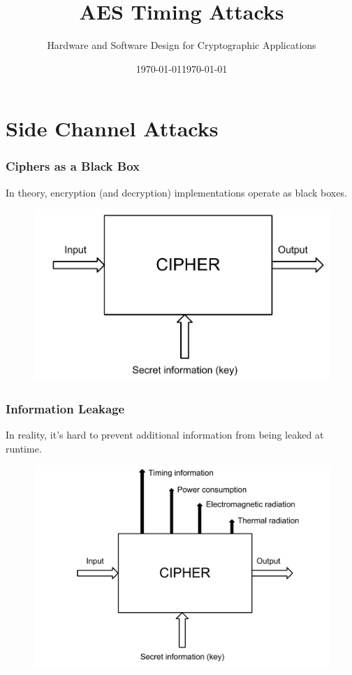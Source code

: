 \documentclass[9pt,handout]{beamer}
\title[AES Timing Attacks]{AES Timing Attacks}
\institute[RIT]{}
\date{\today}
\author{Hardware and Software Design for Cryptographic Applications}
\date{\today}
\begin{document}

\begin{frame}
	\titlepage
\end{frame}

\section{Side Channel Attacks}
\begin{frame}
	\frametitle{Ciphers as a Black Box}
In theory, encryption (and decryption) implementations operate as black boxes.
\begin{figure}
\centering
\includegraphics[scale = 0.5]{images/blackbox.pdf}
\end{figure}

\end{frame}

\begin{frame}
	\frametitle{Information Leakage}
In reality, it's hard to prevent additional information from being leaked at runtime.
\begin{figure}
\centering
\includegraphics[scale = 0.5]{images/leaked.pdf}
\end{figure}
	
\end{frame}
\end{document}
